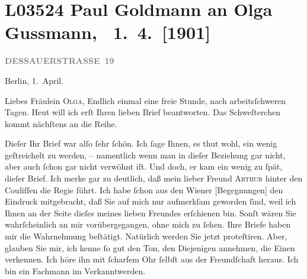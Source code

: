 

\section[ Paul Goldmann an Olga Gussmann, 1. 4. {[}1901{]}]{L03524 Paul Goldmann an Olga Gussmann,  1. 4. {[}1901{]}}
\nopagebreak{}
\rehead{ }\normalsize\beginnumbering{}
\toendnotes[C]{\smallbreak\pagebreak[2]}
\toendnotes[C]{\smallbreak}
\toendnotes[C]{\smallbreak}
\pstart
           \raggedleft{}{\pb}\textcolor{gray}{\textbf{DESSAUERSTRASSE 19}}\pend
           
\pstart
           Berlin, 1. April.\pend
           
\pstart\center{}Liebes Fräulein \textsc{Olga},\pend\vspace{0.5em}
\pstart
           Endlich einmal eine freie Stunde, nach arbeitsſchweren Tagen. Heut will ich erſt Ihren lieben Brief beantworten. Das Schweſterchen kommt nächſtens an die
               Reihe.\pend
           
\pstart
           Dieſer Ihr Brief war alſo{ }ſehr{ }ſchön. Ich{ }ſage Ihnen, es thut wohl, ein wenig
               geſtreichelt zu werden, – namentlich wenn man in dieſer Beziehung gar nicht, aber
               auch{ }ſchon gar nicht verwöhnt iſt. Und doch, er kam ein wenig zu{ }ſpät, dieſer Brief.
               Ich merke gar zu deutlich, daß mein lieber Freund \textsc{Arthur} hinter den Couliſſen die Regie führt. Ich habe{ }ſchon aus den 
               Wiener {[}Begegnungen{]}{ }{\pb}den Eindruck mitgebracht, \strikeout{\textcolor{gray}{×}\-\textcolor{gray}{×}\-\textcolor{gray}{×}} daß Sie auf mich nur aufmerkſam geworden{ }ſind, weil ich Ihnen an der Seite
               dieſes meines lieben Freundes
               erſchienen bin. Sonſt wären Sie wahrſcheinlich an mir vorübergegangen, ohne mich zu{ }ſehen. Ihre Briefe haben mir die Wahrnehmung beſtätigt. Natürlich werden Sie jetzt
               proteſtiren. Aber, glauben Sie mir, ich kenne{ }ſo gut den Ton, den Diejenigen
               annehmen, die Einen verkennen. Ich höre ihn mit{ }ſcharfem Ohr{ }ſelbſt aus der
               Freundſchaft heraus. Ich bin ein Fachmann im Verkanntwerden.\pend
           
